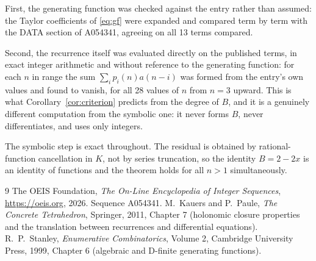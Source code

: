 \documentclass[11pt,a4paper]{article}
\theoremstyle{plain}
\theoremstyle{definition}
\begin{document}
First, the generating function was checked against the entry rather than assumed: the
Taylor coefficients of \eqref{eq:gf} were expanded and compared term by term with the DATA
section of A054341, agreeing on all 13 terms compared.

Second, the recurrence itself was evaluated directly on the published terms, in exact
integer arithmetic and without reference to the generating function: for each $n$ in range
the sum $\sum_{i}p_{i}(n)a(n-i)$ was formed from the entry's own values and found to
vanish, for all 28 values of $n$ from $n=3$ upward. This is what
Corollary~\ref{cor:criterion} predicts from the degree of $B$, and it is a genuinely
different computation from the symbolic one: it never forms $B$, never differentiates, and
uses only integers.

The symbolic step is exact throughout. The residual is obtained by rational-function
cancellation in $K$, not by series truncation, so the identity $B=2 - 2 x$ is an
identity of functions and the theorem holds for all $n>1$ simultaneously.

\begin{thebibliography}{9}
 The OEIS Foundation, \emph{The On-Line Encyclopedia of Integer Sequences},
\url{https://oeis.org}, 2026. Sequence A054341.
 M.~Kauers and P.~Paule, \emph{The Concrete Tetrahedron}, Springer, 2011,
Chapter 7 (holonomic closure properties and the translation between recurrences and
differential equations).
 R.~P.~Stanley, \emph{Enumerative Combinatorics}, Volume 2, Cambridge
University Press, 1999, Chapter 6 (algebraic and D-finite generating functions).
\end{thebibliography}
\end{document}
